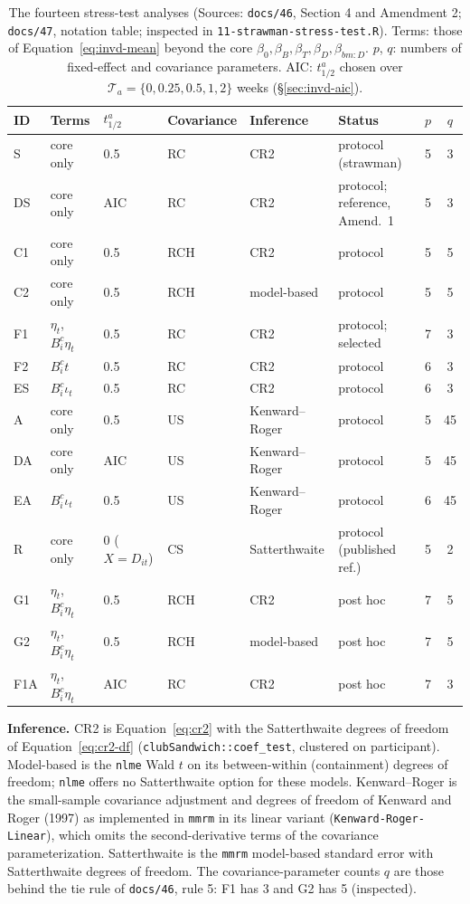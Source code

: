 \documentclass[11pt]{article}
\newcommand{\code}[1]{\texttt{#1}}
\begin{document}
\begin{table}[h]
\centering\footnotesize
\caption{The fourteen stress-test analyses (Sources: \code{docs/46},
Section 4 and Amendment 2; \code{docs/47}, notation table; inspected in
\code{11-strawman-stress-test.R}). Terms: those of
Equation~\eqref{eq:invd-mean} beyond the core
$\beta_0, \beta_B, \beta_T, \beta_D, \beta_{bm:D}$. $p$, $q$: numbers
of fixed-effect and covariance parameters. AIC: $t^{a}_{1/2}$ chosen
over $\mathcal T_a = \{0, 0.25, 0.5, 1, 2\}$ weeks
(\S\ref{sec:invd-aic}).}
\label{tab:invd-analyses}
\begin{tabular}{@{}llllllcc@{}}
\toprule
ID & Terms & $t^{a}_{1/2}$ & Covariance & Inference & Status & $p$ & $q$ \\
\midrule
S   & core only & 0.5 & RC  & CR2 & protocol (strawman) & 5 & 3 \\
DS  & core only & AIC & RC  & CR2 & protocol; reference, Amend.~1 & 5 & 3 \\
C1  & core only & 0.5 & RCH & CR2 & protocol & 5 & 5 \\
C2  & core only & 0.5 & RCH & model-based & protocol & 5 & 5 \\
F1  & $\eta_t$, $B^{c}_i\eta_t$ & 0.5 & RC & CR2 & protocol; selected & 7 & 3 \\
F2  & $B^{c}_i t$ & 0.5 & RC & CR2 & protocol & 6 & 3 \\
ES  & $B^{c}_i\iota_t$ & 0.5 & RC & CR2 & protocol & 6 & 3 \\
A   & core only & 0.5 & US & Kenward--Roger & protocol & 5 & 45 \\
DA  & core only & AIC & US & Kenward--Roger & protocol & 5 & 45 \\
EA  & $B^{c}_i\iota_t$ & 0.5 & US & Kenward--Roger & protocol & 6 & 45 \\
R   & core only & 0 ($X = D_{it}$) & CS & Satterthwaite & protocol (published ref.) & 5 & 2 \\
G1  & $\eta_t$, $B^{c}_i\eta_t$ & 0.5 & RCH & CR2 & post hoc & 7 & 5 \\
G2  & $\eta_t$, $B^{c}_i\eta_t$ & 0.5 & RCH & model-based & post hoc & 7 & 5 \\
F1A & $\eta_t$, $B^{c}_i\eta_t$ & AIC & RC & CR2 & post hoc & 7 & 3 \\
\bottomrule
\end{tabular}
\end{table}

\textbf{Inference.} CR2 is Equation~\eqref{eq:cr2} with the
Satterthwaite degrees of freedom of Equation~\eqref{eq:cr2-df}
(\code{clubSandwich::coef\_test}, clustered on participant).
Model-based is the \code{nlme} Wald $t$ on its between-within
(containment) degrees of freedom; \code{nlme} offers no Satterthwaite
option for these models. Kenward--Roger is the small-sample covariance
adjustment and degrees of freedom of Kenward and Roger (1997) as
implemented in \code{mmrm} in its linear variant
(\code{Kenward-Roger-Linear}), which omits the second-derivative terms
of the covariance parameterization. Satterthwaite is the \code{mmrm}
model-based standard error with Satterthwaite degrees of freedom. The
covariance-parameter counts $q$ are those behind the tie rule of
\code{docs/46}, rule 5: F1 has 3 and G2 has 5 (inspected).
\end{document}
